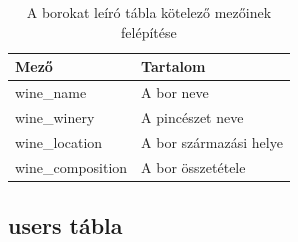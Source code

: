 \documentclass[12pt]{report}
\theoremstyle{definition}
\begin{document}
	\begin{table}[!ht]
		\begin{center}
			\begin{tabular}{| l | l |}
				\hline
				\textbf{Mező} & \textbf{Tartalom} \\ \hline
				wine\_name & A bor neve \\ \hline
				wine\_winery & A pincészet neve \\ \hline
				wine\_location & A bor származási helye \\ \hline
				wine\_composition & A bor összetétele \\ \hline
			\end{tabular}
		\end{center}
		\caption{A borokat leíró tábla kötelező mezőinek felépítése \label{tbl:wines-content}}
	\end{table}
	
	\subsection{users tábla}
	
\end{document}
